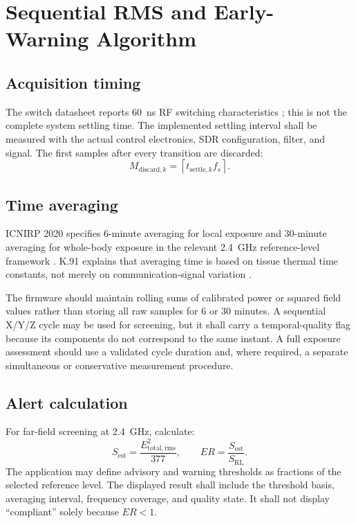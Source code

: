 \documentclass[11pt,a4paper]{article}
\begin{document}
\section{Sequential RMS and Early-Warning Algorithm}

\subsection{Acquisition timing}
The switch datasheet reports 60~ns RF switching characteristics \cite{SKY13322-375LF-EVB}; this is not the complete system settling time. The implemented settling interval shall be measured with the actual control electronics, SDR configuration, filter, and signal. The first samples after every transition are discarded:
\begin{equation}
  M_{\mathrm{discard},k}=\left\lceil t_{\mathrm{settle},k}f_s\right\rceil .
  \label{eq:discard}
\end{equation}

\subsection{Time averaging}
ICNIRP 2020 specifies 6-minute averaging for local exposure and 30-minute averaging for whole-body exposure in the relevant 2.4~GHz reference-level framework \cite[Tables~5--6]{ICNIRP-2020}. K.91 explains that averaging time is based on tissue thermal time constants, not merely on communication-signal variation \cite[Sec.~7.2.3]{ITU-T-K.91}.

The firmware should maintain rolling sums of calibrated power or squared field values rather than storing all raw samples for 6 or 30 minutes. A sequential X/Y/Z cycle may be used for screening, but it shall carry a temporal-quality flag because its components do not correspond to the same instant. A full exposure assessment should use a validated cycle duration and, where required, a separate simultaneous or conservative measurement procedure.

\subsection{Alert calculation}
For far-field screening at 2.4~GHz, calculate:
\begin{equation}
  S_{\mathrm{est}}=\frac{E_{\mathrm{total,rms}}^2}{377},
  \qquad
  ER=\frac{S_{\mathrm{est}}}{S_{\mathrm{RL}}}.
  \label{eq:alert}
\end{equation}
The application may define advisory and warning thresholds as fractions of the selected reference level. The displayed result shall include the threshold basis, averaging interval, frequency coverage, and quality state. It shall not display ``compliant'' solely because $ER<1$.
\end{document}
